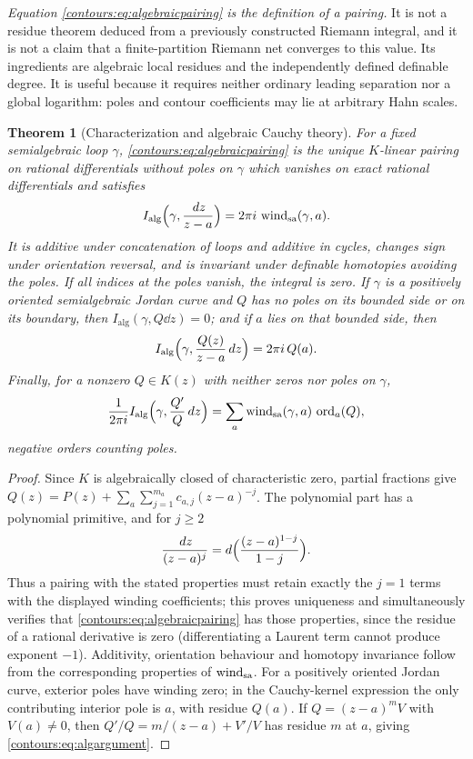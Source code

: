 \documentclass[11pt,letterpaper]{article}
\newtheorem{theorem}{Theorem}[section]
\theoremstyle{definition}
\theoremstyle{remark}
\newcommand{\ord}{\operatorname{ord}}\newcommand{\Tr}{\operatorname{Tr}}
\numberwithin{equation}{section}
\begin{document}
\emph{Equation \eqref{contours:eq:algebraicpairing} is the definition of a pairing.}
It is not a residue theorem deduced from a previously constructed Riemann integral,
and it is not a claim that a finite-partition Riemann net converges to this value.
Its ingredients are algebraic local residues and the independently defined definable
degree. It is useful because it requires neither ordinary leading separation nor a
global logarithm: poles and contour coefficients may lie at arbitrary Hahn scales.

\begin{theorem}[Characterization and algebraic Cauchy theory]
\label{contours:thm:algpairing}
For a fixed semialgebraic loop $\gamma$, \eqref{contours:eq:algebraicpairing} is
\emph{the unique} $K$-linear pairing on rational differentials without poles on
$\gamma$ which vanishes on exact rational differentials and satisfies
\[
  I_{\mathrm{alg}}\Bigl(\gamma,\frac{\,d z}{z-a}\Bigr)
  =2\pi i\,\operatorname{wind}_{\mathrm{sa}}(\gamma,a).
\]
It is additive under concatenation of loops and additive in cycles, changes sign
under orientation reversal, and is invariant under definable homotopies avoiding the
poles. If all indices at the poles vanish, the integral is zero. If $\gamma$ is a
positively oriented semialgebraic Jordan curve and $Q$ has no poles on its bounded
side or on its boundary, then $I_{\mathrm{alg}}(\gamma,Q\dd z)=0$; and if $a$ lies on
that bounded side, then
\[
  I_{\mathrm{alg}}\Bigl(\gamma,\frac{Q(z)}{z-a}\,d z\Bigr)=2\pi i\,Q(a).
\]
Finally, for a nonzero $Q\in K(z)$ with neither zeros nor poles on $\gamma$,
\begin{equation}\label{contours:eq:algargument}
  \frac1{2\pi i}I_{\mathrm{alg}}\Bigl(\gamma,\frac{Q'}{Q}\dd z\Bigr)
  =\sum_a\wind_{\mathrm{sa}}(\gamma,a)\,\ord_a(Q),
\end{equation}
negative orders counting poles.
\end{theorem}
\begin{proof}
Since $K$ is algebraically closed of characteristic zero, partial fractions give
$Q(z)=P(z)+\sum_a\sum_{j=1}^{m_a}c_{a,j}(z-a)^{-j}$. The polynomial part has a
polynomial primitive, and for $j\ge2$
\[
  \frac{\,d z}{(z-a)^j}=d\Bigl(\frac{(z-a)^{1-j}}{1-j}\Bigr).
\]
Thus a pairing with the stated properties must retain exactly the $j=1$ terms with
the displayed winding coefficients; this proves uniqueness and simultaneously
verifies that \eqref{contours:eq:algebraicpairing} has those properties, since the
residue of a rational derivative is zero (differentiating a Laurent term cannot
produce exponent $-1$). Additivity, orientation behaviour and homotopy invariance
follow from the corresponding properties of $\operatorname{wind}_{\mathrm{sa}}$. For a positively
oriented Jordan curve, exterior poles have winding zero; in the Cauchy-kernel
expression the only contributing interior pole is $a$, with residue $Q(a)$. If
$Q=(z-a)^mV$ with $V(a)\ne0$, then $Q'/Q=m/(z-a)+V'/V$ has residue $m$ at $a$,
giving \eqref{contours:eq:algargument}.
\end{proof}
\end{document}
